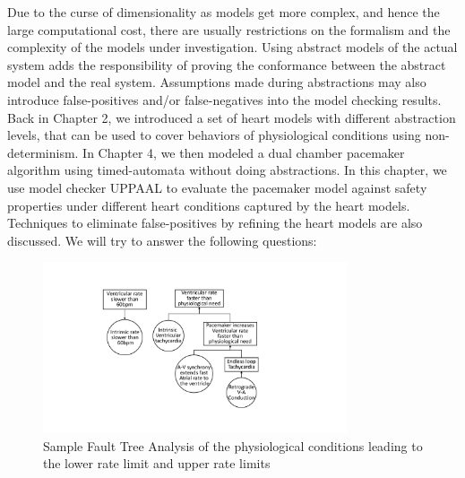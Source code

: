 Due to the curse of dimensionality as models get more complex, and hence the large computational cost, there are usually restrictions on the formalism and the complexity of the models under investigation. Using abstract models of the actual system adds the responsibility of proving the conformance between the abstract model and the real system. Assumptions made during abstractions may also introduce false-positives and/or false-negatives into the model checking results. Back in Chapter 2, we introduced a set of heart models with different abstraction levels, that can be used to cover behaviors of physiological conditions using non-determinism. In Chapter 4, we then modeled a dual chamber pacemaker algorithm using timed-automata without doing abstractions. In this chapter, we use model checker UPPAAL to evaluate the pacemaker model against safety properties under different heart conditions captured by the heart models. Techniques to eliminate false-positives by refining the heart models are also discussed. We will try to answer the following questions:
\begin{figure}[!t]
		\centering
		\includegraphics[width=0.8\textwidth]{figs/risk_requirements.pdf}
		\caption{\small Sample Fault Tree Analysis of the physiological conditions leading to the lower rate limit and upper rate limits}
		\label{fig:risk_req}
\end{figure}


